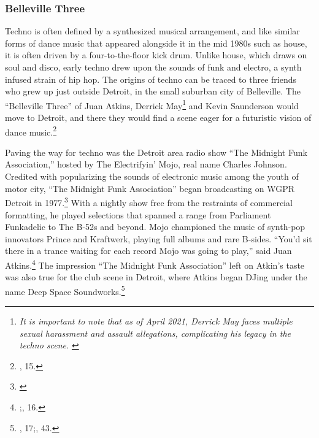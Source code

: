 \documentclass[12pt,twoside]{reedthesis}
\begin{document}
\subsubsection{Belleville Three}
Techno is often defined by a synthesized musical arrangement, and like similar forms of dance music that appeared alongside it in the mid 1980s such as house, it is often driven by a four-to-the-floor kick drum. Unlike house, which draws on soul and disco, early techno drew upon the sounds of funk and electro, a synth infused strain of hip hop. The origins of techno can be traced to three friends who grew up just outside Detroit, in the small suburban city of Belleville. The ``Belleville Three'' of Juan Atkins, Derrick May\footnote{\emph{It is important to note that as of April 2021, Derrick May faces multiple sexual harassment and assault allegations, complicating his legacy in the techno scene.} \cite{rossSevenMoreDerrick2021}} and Kevin Saunderson would move to Detroit, and there they would find a scene eager for a futuristic vision of dance music.\footnote{\cite{reynoldsGenerationEcstasyWorld1998}, 15.} 

Paving the way for techno was the Detroit area radio show ``The Midnight Funk Association,'' hosted by The Electrifyin' Mojo, real name Charles Johnson. Credited with popularizing the sounds of electronic music among the youth of motor city, ``The Midnight Funk Association'' began broadcasting on WGPR Detroit in 1977.\footnote{\cite{zlatopolskyTheaterMindLegacy2015}} With a nightly show free from the restraints of commercial formatting, he played selections that spanned a range from Parliament Funkadelic to The B-52s and beyond. Mojo championed the music of synth-pop innovators Prince and Kraftwerk, playing full albums and rare B-sides. ``You’d sit there in a trance waiting for each record Mojo was going to play,'' said Juan Atkins.\footnote{\cite{zlatopolskyTheaterMindLegacy2015};\cite{reynoldsGenerationEcstasyWorld1998}, 16.} The impression ``The Midnight Funk Association'' left on Atkin's taste was also true for the club scene in Detroit, where Atkins began DJing under the name Deep Space Soundworks.\footnote{\cite{reynoldsGenerationEcstasyWorld1998}, 17;\cite{sickoTechnoRebelsRenegades2010}, 43.}
\end{document}
